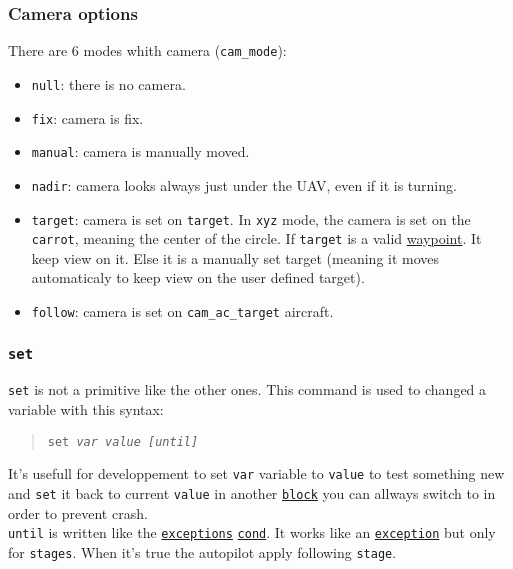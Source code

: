 \documentclass{article}
\renewcommand{\tt}[1]{\texttt{#1}}
\newcommand{\until}{%
	\tt{until} is written like the \tt{\hyperlink{exceptions}{exceptions}}
		\tt{\hyperlink{cond}{cond}}. It works like an
		\tt{\hyperlink{exceptions}{exception}} but only for \tt{stages}.
		When it's true the autopilot apply following \tt{stage}.
}
\begin{document}
\hypertarget{cam}{\subsubsection{Camera options}}
\label{cam2}
There are 6 modes whith camera (\tt{cam\_mode}):
\begin{itemize}
	\item \tt{null}: there is no camera.
	\item \tt{fix}: camera is fix.
	\item \tt{manual}: camera is manually moved.
	\item \tt{nadir}: camera looks always just under the UAV, even if it is turning.
	\item \tt{target}: camera is set on \tt{target}. In \tt{xyz} mode, the
	camera is set on the \tt{carrot}, meaning the center of the circle.
	If \tt{target} is a valid \hyperlink{waypoints}{waypoint}. It keep view on it.
	Else it is a manually set target (meaning it moves automaticaly to keep
	view on the user defined target).
	\item \tt{follow}: camera is set on \tt{cam\_ac\_target} aircraft.
\end{itemize}


\hypertarget{set}{\subsubsection{\tt{set}}}
\tt{set} is not a primitive like the other ones. This command is used to
changed a variable with this syntax:

\begin{quote}
	\tt{set \emph{var value [until]}}
\end{quote}


It's usefull for developpement to set \tt{var} variable to \tt{value} to test
something new and \tt{set} it back to current \tt{value} in another
\hyperlink{blocks}{\tt{block}} you can allways switch to in order to prevent
crash. \\

\until \\
\end{document}
